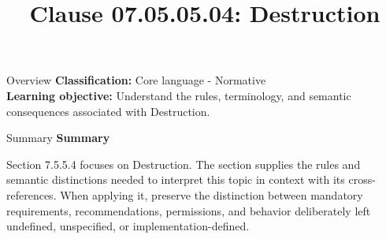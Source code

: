 \documentclass[10pt,letterpaper]{article}
\title{Clause 07.05.05.04: Destruction}
\author{}
\date{}
\begin{document}
\maketitle
\begin{CornellOverviewBox}{Overview}
\textbf{Classification:} Core language - Normative\\[2pt]
\textbf{Learning objective:} Understand the rules, terminology, and semantic consequences associated with Destruction.
\end{CornellOverviewBox}\begin{CornellSummaryBox}{Summary}
{\sffamily\bfseries\color{Accent} Summary}\par\vspace{3pt}Section 7.5.5.4 focuses on Destruction. The section supplies the rules and semantic distinctions needed to interpret this topic in context with its cross-references. When applying it, preserve the distinction between mandatory requirements, recommendations, permissions, and behavior deliberately left undefined, unspecified, or implementation-defined.
\end{CornellSummaryBox}
\end{document}
